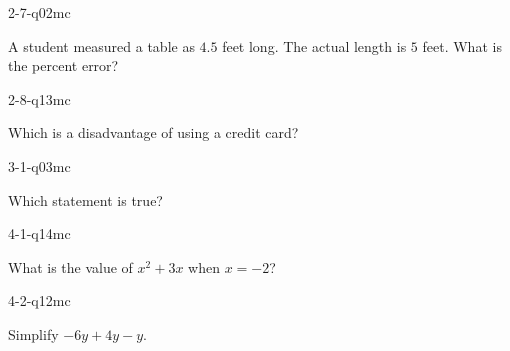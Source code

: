 \begin{practiceQuestion}{2-7-q02}{mc}
\begin{questionText}
A student measured a table as $4.5$ feet long. The actual length is $5$ feet. What is the percent error?
\end{questionText}
\end{practiceQuestion}

\begin{practiceQuestion}{2-8-q13}{mc}
\begin{questionText}
Which is a disadvantage of using a credit card?
\end{questionText}
\end{practiceQuestion}

\begin{practiceQuestion}{3-1-q03}{mc}
\begin{questionText}
Which statement is true?
\end{questionText}
\end{practiceQuestion}

\begin{practiceQuestion}{4-1-q14}{mc}
\begin{questionText}
What is the value of $x^2 + 3x$ when $x = -2$?
\end{questionText}
\end{practiceQuestion}

\begin{practiceQuestion}{4-2-q12}{mc}
\begin{questionText}
Simplify $-6y + 4y - y$.
\end{questionText}
\end{practiceQuestion}


